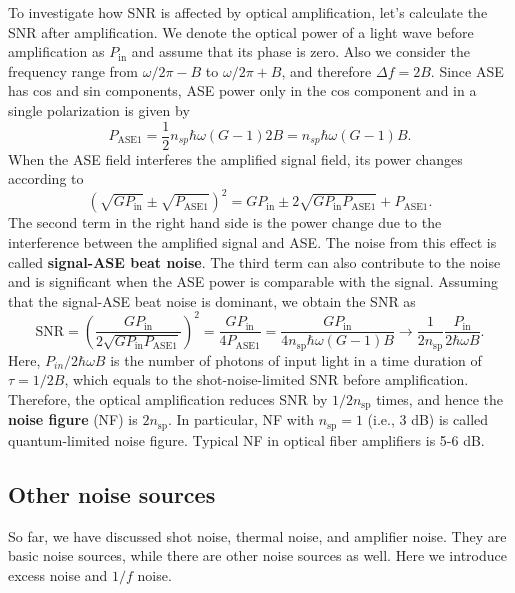 To investigate how SNR is affected by optical amplification, let's calculate the SNR after amplification. We denote the optical power of a light wave before amplification as $P_\mathrm{in}$ and assume that its phase is zero. Also we consider the frequency range from $\omega/2\pi - B$ to $\omega/2\pi + B$, and therefore $\Delta f = 2B$. Since ASE has cos and sin components, ASE power only in the cos component and in a single polarization is given by
\begin{equation}
  P_\mathrm{ASE1} = \frac{1}{2}n_{sp}\hbar\omega(G-1)2B = n_{sp}\hbar\omega(G-1)B.
\end{equation}
When the ASE field interferes the amplified signal field, its power changes according to
\begin{equation}
  \left(\sqrt{GP_\mathrm{in}} \pm \sqrt{P_\mathrm{ASE1}}\right)^2 = GP_\mathrm{in} \pm 2\sqrt{GP_\mathrm{in}P_\mathrm{ASE1}} + P_\mathrm{ASE1}.
\end{equation}
The second term in the right hand side is the power change due to the interference between the amplified signal and ASE. The noise from this effect is called \textbf{signal-ASE beat noise}. The third term can also contribute to the noise and is significant when the ASE power is comparable with the signal. Assuming that the signal-ASE beat noise is dominant, we obtain the SNR as
\begin{equation}
  \mathrm{SNR} = \left(\frac{GP_\mathrm{in}}{2\sqrt{GP_\mathrm{in}P_\mathrm{ASE1}}}\right)^2 = \frac{GP_\mathrm{in}}{4P_\mathrm{ASE1}}=\frac{GP_\mathrm{in}}{4n_\mathrm{sp}\hbar\omega(G-1)B}\to \frac{1}{2n_\mathrm{sp}}\frac{P_\mathrm{in}}{2\hbar\omega B}.
\end{equation}
Here, $P_{in}/2\hbar\omega B$ is the number of photons of input light in a time duration of $\tau = 1/2B$, which equals to the shot-noise-limited SNR before amplification. Therefore, the optical amplification reduces SNR by $1/2n_\mathrm{sp}$ times, and hence the \textbf{noise figure} (NF) is $2n_\mathrm{sp}$. In particular, NF with $n_\mathrm{sp} = 1$ (i.e., 3 dB) is called quantum-limited noise figure. Typical NF in optical fiber amplifiers is 5-6 dB.
\subsection{Other noise sources}
So far, we have discussed shot noise, thermal noise, and amplifier noise. They are basic noise sources, while there are other noise sources as well. Here we introduce excess noise and $1/f$ noise.


